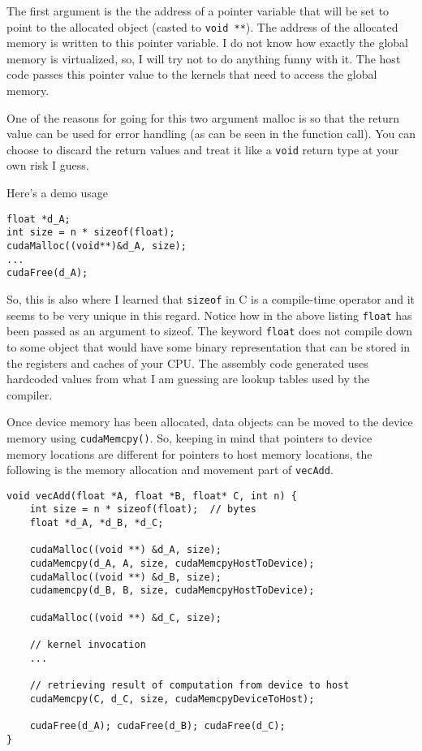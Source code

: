 The first argument is the the address of a pointer variable that
will be set to point to the allocated object (casted to \texttt{void **}).
The address of the allocated memory is written to this pointer
variable. I do not know how exactly the  global memory is virtualized,
so, I will try not to do anything funny with it. The host code
passes this pointer value to the kernels that need to access the
global memory.

One of the reasons for going for this two argument malloc is so
that the return value can be used for error handling (as can be
seen in the function call). You can choose to discard the return
values and treat it like a \texttt{void} return type at your own
risk I guess.

Here's a demo usage

\begin{verbatim}
float *d_A;
int size = n * sizeof(float);
cudaMalloc((void**)&d_A, size); 
...
cudaFree(d_A);
\end{verbatim}

So, this is also where I learned that \texttt{sizeof} in C is a
compile-time operator and it seems to be very unique in this
regard. Notice how in the above listing \texttt{float} has been
passed as an argument to sizeof. The keyword \texttt{float} does
not compile down to some object that would have some binary 
representation that can be stored in the registers and caches
of your CPU. The assembly code generated uses hardcoded values
from what I am guessing are lookup tables used by the compiler.

Once device memory has been allocated, data objects can be moved
to the device memory using \texttt{cudaMemcpy()}. So, keeping in
mind that pointers  to device memory locations are different for
pointers to host memory locations, the following is the memory
allocation and movement part of \texttt{vecAdd}.

\begin{verbatim}
void vecAdd(float *A, float *B, float* C, int n) {
    int size = n * sizeof(float);  // bytes
    float *d_A, *d_B, *d_C;

    cudaMalloc((void **) &d_A, size);
    cudaMemcpy(d_A, A, size, cudaMemcpyHostToDevice);
    cudaMalloc((void **) &d_B, size);
    cudamemcpy(d_B, B, size, cudaMemcpyHostToDevice);

    cudaMalloc((void **) &d_C, size);

    // kernel invocation
    ...

    // retrieving result of computation from device to host
    cudaMemcpy(C, d_C, size, cudaMemcpyDeviceToHost);

    cudaFree(d_A); cudaFree(d_B); cudaFree(d_C);
}
\end{verbatim}

